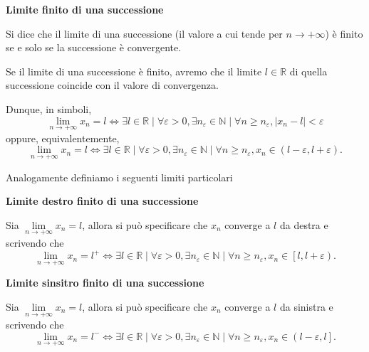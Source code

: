 \begin{definition}
    \textbf{Limite finito di una successione}

    Si dice che il limite di una successione (il valore a cui tende per
    $n\rightarrow+\infty$) è finito se e solo se la successione è convergente.
    
    Se il limite di una successione è finito, avremo che il limite $l\in\mathbb{R}$
    di quella successione coincide con il valore di convergenza.

    Dunque, in simboli,
    \[
        \underset{n\rightarrow+\infty}{\lim} x_n = l \Leftrightarrow
        \exists l \in\mathbb{R} \mid \forall\varepsilon>0, \exists n_\varepsilon\in\mathbb{N}\mid
        \forall n \geq n_\varepsilon, \left|x_n-l\right|<\varepsilon
    \]
    oppure, equivalentemente,
    \[
        \underset{n\rightarrow+\infty}{\lim} x_n = l \Leftrightarrow
        \exists l \in\mathbb{R} \mid \forall\varepsilon>0, \exists n_\varepsilon\in\mathbb{N}\mid
        \forall n \geq n_\varepsilon, x_n\in\left(l-\varepsilon, l+\varepsilon\right).
    \]
\end{definition}

Analogamente definiamo i seguenti limiti particolari

\begin{definition}
    \textbf{Limite destro finito di una successione}

    Sia $\underset{n\rightarrow+\infty}{\lim} x_n = l$, allora si può specificare
    che $x_n$ converge a $l$ da destra e scrivendo che
    \[
        \underset{n\rightarrow+\infty}{\lim} x_n = l^+ \Leftrightarrow
        \exists l \in\mathbb{R} \mid \forall\varepsilon>0, \exists n_\varepsilon\in\mathbb{N}\mid
        \forall n \geq n_\varepsilon, x_n\in\left[l, l+\varepsilon\right).
    \]
\end{definition}

\begin{definition}
    \textbf{Limite sinsitro finito di una successione}

    Sia $\underset{n\rightarrow+\infty}{\lim} x_n = l$, allora si può specificare
    che $x_n$ converge a $l$ da sinistra e scrivendo che
    \[
        \underset{n\rightarrow+\infty}{\lim} x_n = l^- \Leftrightarrow
        \exists l \in\mathbb{R} \mid \forall\varepsilon>0, \exists n_\varepsilon\in\mathbb{N}\mid
        \forall n \geq n_\varepsilon, x_n\in\left(l-\varepsilon, l\right].
    \]
\end{definition}


